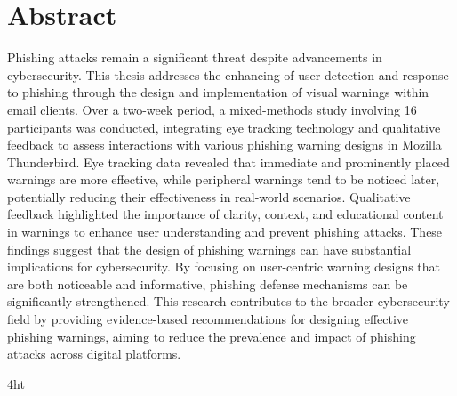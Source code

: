 \documentclass[
  a4paper,  %
  twoside,  %
  bibliography=totoc,
  headsepline,
  cleardoublepage=empty,
  parskip=half,
  draft=false
]{scrbook}
\begin{document}
\cleardoublepage

\section*{Abstract} 
Phishing attacks remain a significant threat despite advancements in cybersecurity. This thesis addresses the enhancing of user detection and response to phishing through the design and implementation of visual warnings within email clients. Over a two-week period, a mixed-methods study involving 16 participants was conducted, integrating eye tracking technology and qualitative feedback to assess interactions with various phishing warning designs in Mozilla Thunderbird. \newline
Eye tracking data revealed that immediate and prominently placed warnings are more effective, while peripheral warnings tend to be noticed later, potentially reducing their effectiveness in real-world scenarios. Qualitative feedback highlighted the importance of clarity, context, and educational content in warnings to enhance user understanding and prevent phishing attacks. \newline
These findings suggest that the design of phishing warnings can have substantial implications for cybersecurity. By focusing on user-centric warning designs that are both noticeable and informative, phishing defense mechanisms can be significantly strengthened. This research contributes to the broader cybersecurity field by providing evidence-based recommendations for designing effective phishing warnings, aiming to reduce the prevalence and impact of phishing attacks across digital platforms.

\cleardoublepage



\iftex4ht
\else
\fi

%
%

%
%
%
\tableofcontents

\end{document}
